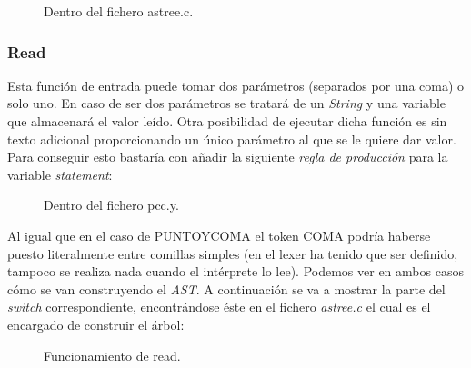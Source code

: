 \documentclass[11pt]{article}
\begin{document}
\begin{figure}[H]
  \centering
  \caption{Dentro del fichero astree.c.}
\end{figure}

\newpage

\subsubsection{Read}

\noindent Esta función de entrada puede tomar dos parámetros (separados por una coma) o solo uno. En caso de ser dos parámetros se tratará de un \textit{String} y una variable que almacenará el valor leído. Otra  posibilidad de ejecutar dicha función es sin texto adicional proporcionando un único parámetro al que se le quiere dar valor. Para conseguir esto bastaría con añadir la siguiente \textit{regla de producción} para la variable \textit{statement}:


\begin{figure}[H]
  \centering
  \caption{Dentro del fichero pcc.y.}
\end{figure}

\noindent Al igual que en el caso de PUNTOYCOMA el token COMA podría haberse puesto literalmente entre comillas simples (en el lexer ha tenido que ser definido, tampoco se realiza nada cuando el intérprete lo lee). Podemos ver en ambos casos cómo se van construyendo el \textit{AST}. A continuación se va a mostrar la parte del \textit{switch} correspondiente, encontrándose éste en el fichero \textit{astree.c} el cual es el encargado de construir el árbol:

\begin{figure}[H]
  \centering
  \caption{Funcionamiento de read.}
\end{figure}
\end{document}
